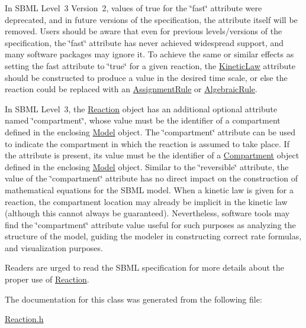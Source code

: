 \begin{DoxyParagraph}{}
In S\+B\+ML Level~3 Version~2, values of {\ttfamily true} for the \char`\"{}fast\char`\"{} attribute were deprecated, and in future versions of the specification, the attribute itself will be removed. Users should be aware that even for previous levels/versions of the specification, the \char`\"{}fast\char`\"{} attribute has never achieved widespread support, and many software packages may ignore it. To achieve the same or similar effects as setting the fast attribute to \char`\"{}true\char`\"{} for a given reaction, the \hyperlink{class_kinetic_law}{Kinetic\+Law} attribute should be constructed to produce a value in the desired time scale, or else the reaction could be replaced with an \hyperlink{class_assignment_rule}{Assignment\+Rule} or \hyperlink{class_algebraic_rule}{Algebraic\+Rule}.
\end{DoxyParagraph}
In S\+B\+ML Level~3, the \hyperlink{class_reaction}{Reaction} object has an additional optional attribute named \char`\"{}compartment\char`\"{}, whose value must be the identifier of a compartment defined in the enclosing \hyperlink{class_model}{Model} object. The \char`\"{}compartment\char`\"{} attribute can be used to indicate the compartment in which the reaction is assumed to take place. If the attribute is present, its value must be the identifier of a \hyperlink{class_compartment}{Compartment} object defined in the enclosing \hyperlink{class_model}{Model} object. Similar to the \char`\"{}reversible\char`\"{} attribute, the value of the \char`\"{}compartment\char`\"{} attribute has no direct impact on the construction of mathematical equations for the S\+B\+ML model. When a kinetic law is given for a reaction, the compartment location may already be implicit in the kinetic law (although this cannot always be guaranteed). Nevertheless, software tools may find the \char`\"{}compartment\char`\"{} attribute value useful for such purposes as analyzing the structure of the model, guiding the modeler in constructing correct rate formulas, and visualization purposes.

Readers are urged to read the S\+B\+ML specification for more details about the proper use of \hyperlink{class_reaction}{Reaction}. 

The documentation for this class was generated from the following file\+:\begin{DoxyCompactItemize}
\item 
\hyperlink{_reaction_8h}{Reaction.\+h}\end{DoxyCompactItemize}
